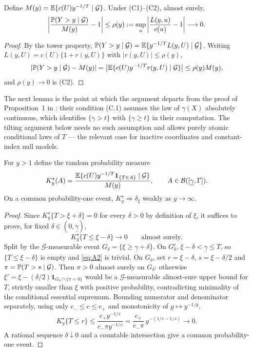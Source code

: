 \begin{lemma}\label{lem:app-remainder}
Define $M(y)=\mathbb E\{c(U)y^{-1/T}\mid\mathcal G\}$.  Under (C1)--(C2), almost
surely,
\begin{equation}
 \left|\frac{\mathbb P(Y>y\mid\mathcal G)}{M(y)}-1\right|
 \le\rho(y):=\sup_u\left|\frac{L(y,u)}{c(u)}-1\right|\longrightarrow0.
 \label{eq:A1}
\end{equation}
\end{lemma}

\begin{proof}
By the tower property,
$\mathbb P(Y>y\mid\mathcal G)=\mathbb E\{y^{-1/T}L(y,U)\mid\mathcal G\}$.  Writing
$L(y,U)=c(U)\{1+r(y,U)\}$ with $|r(y,U)|\le\rho(y)$,
\[
 |\mathbb P(Y>y\mid\mathcal G)-M(y)|
 =\bigl|\mathbb E\{c(U)y^{-1/T}r(y,U)\mid\mathcal G\}\bigr|
 \le\rho(y)M(y),
\]
and $\rho(y)\to0$ is (C2).
\end{proof}

The next lemma is the point at which the argument departs from the proof
of Proposition~1 in \citet{gardesPodgorny2025}: their condition (C.1)
assumes the law of $\gamma(X)$ absolutely continuous, which identifies
$\{\gamma>t\}$ with $\{\gamma\ge t\}$ in their computation.  The tilting
argument below needs no such assumption and allows purely atomic
conditional laws of $T$ --- the relevant case for inactive coordinates
and constant-index null models.

\begin{lemma}\label{lem:app-tilt}
For $y>1$ define the random probability measure
\[
 K_y^\star(A)=
 \frac{\mathbb E\{c(U)y^{-1/T}\mathbf 1_{\{T\in A\}}\mid\mathcal G\}}{M(y)},
 \qquad A\in\mathcal B([\underline\gamma,\Gamma]).
\]
On a common probability-one event, $K_y^\star\Rightarrow\delta_\xi$ weakly
as $y\to\infty$.
\end{lemma}

\begin{proof}
Since $K_y^\star\{T>\xi+\delta\}=0$ for every $\delta>0$ by definition of
$\xi$, it suffices to prove, for fixed
$\delta\in(0,\underline\gamma)$,
\begin{equation}
 K_y^\star\{T\le\xi-\delta\}\longrightarrow0\qquad\text{almost surely.}
 \label{eq:A2}
\end{equation}
Split by the $\mathcal G$-measurable event
$G_\delta=\{\xi\ge\underline\gamma+\delta\}$.  On $G_\delta^c$,
$\xi-\delta<\underline\gamma\le T$, so $\{T\le\xi-\delta\}$ is empty and
\eqref{eq:A2} is trivial.  On $G_\delta$, set $r=\xi-\delta$,
$s=\xi-\delta/2$ and $\pi=\mathbb P(T>s\mid\mathcal G)$.  Then $\pi>0$ almost
surely on $G_\delta$: otherwise
$\xi'=\xi-(\delta/2)\mathbf 1_{G_\delta\cap\{\pi=0\}}$ would be a
$\mathcal G$-measurable almost-sure upper bound for $T$, strictly smaller
than $\xi$ with positive probability, contradicting minimality of the
conditional essential supremum.  Bounding numerator and denominator
separately, using only $c_-\le c\le c_+$ and monotonicity of
$g\mapsto y^{-1/g}$,
\[
 K_y^\star\{T\le r\}
 \le\frac{c_+y^{-1/r}}{c_-\pi y^{-1/s}}
 =\frac{c_+}{c_-\pi}\,y^{-(1/r-1/s)}\longrightarrow0.
\]
A rational sequence $\delta\downarrow0$ and a countable intersection give
a common probability-one event.
\end{proof}

